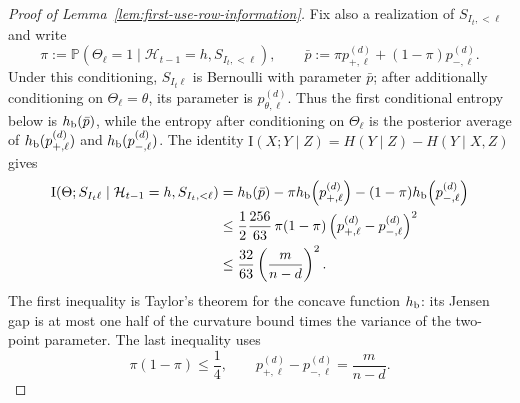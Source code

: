 \documentclass{article}
\theoremstyle{definition}
\newcommand{\Prob}{\mathbb{P}}
\begin{document}
\begin{proof}[Proof of Lemma~\ref{lem:first-use-row-information}]
Fix also a realization of $S_{I_t,<\ell}$ and write
\[
 \pi:=\Prob(\Theta_\ell=1\mid
   \mathcal H_{t-1}=h,S_{I_t,<\ell}),
 \qquad
 \bar p:=\pi p_{+,\ell}^{(d)}+(1-\pi)p_{-,\ell}^{(d)}.
\]
Under this conditioning, $S_{I_t\ell}$ is Bernoulli with parameter $\bar p$;
after additionally conditioning on $\Theta_\ell=\theta$, its parameter is
$p_{\theta,\ell}^{(d)}$.  Thus the first conditional entropy below is
$h_{\rm b}(\bar p)$, while the entropy after conditioning on $\Theta_\ell$ is
the posterior average of $h_{\rm b}(p_{+,\ell}^{(d)})$ and
$h_{\rm b}(p_{-,\ell}^{(d)})$.  The identity
$\mathrm I(X;Y\mid Z)=H(Y\mid Z)-H(Y\mid X,Z)$ gives
\begin{align}
 \mathrm I(
 \Theta;S_{I_t\ell}
 \mid \mathcal H_{t-1}=h,S_{I_t,<\ell})
 &=h_{\rm b}(\bar p)
   -\pi h_{\rm b}\!\left(p_{+,\ell}^{(d)}\right)
   -(1-\pi)h_{\rm b}\!\left(p_{-,\ell}^{(d)}\right)
   \notag\\
 &\le \frac12\frac{256}{63}\,
   \pi(1-\pi)
   \left(p_{+,\ell}^{(d)}-p_{-,\ell}^{(d)}\right)^2
   \notag\\
 &\le\frac{32}{63}
   \left(\frac{m}{n-d}\right)^2.
 \label{eq:one-coordinate-mutual-information}
\end{align}
The first inequality is Taylor's theorem for the concave function $h_{\rm b}$:
its Jensen gap is at most one half of the curvature bound times the variance of
the two-point parameter.  The last inequality uses
\[
 \pi(1-\pi)\le\frac14,
 \qquad
 p_{+,\ell}^{(d)}-p_{-,\ell}^{(d)}=\frac{m}{n-d}.
\]


\end{proof}
\end{document}
